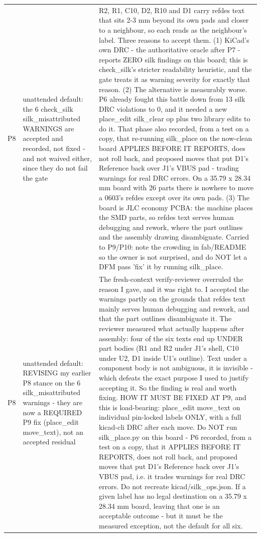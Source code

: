 \documentclass[11pt,a4paper]{article}
\begin{document}
{\begin{longtable}{lp{5.2cm}p{7.2cm}}
P8 & unattended default: the 6 check\_silk silk\_misattributed WARNINGS are accepted and recorded, not fixed - and not waived either, since they do not fail the gate & R2, R1, C10, D2, R10 and D1 carry refdes text that sits 2-3 mm beyond its own pads and closer to a neighbour, so each reads as the neighbour's label. Three reasons to accept them. (1) KiCad's own DRC - the authoritative oracle after P7 - reports ZERO silk findings on this board; this is check\_silk's stricter readability heuristic, and the gate treats it as warning severity for exactly that reason. (2) The alternative is measurably worse. P6 already fought this battle down from 13 silk DRC violations to 0, and it needed a new place\_edit silk\_clear op plus two library edits to do it. That phase also recorded, from a test on a copy, that re-running silk\_place on the now-clean board APPLIES BEFORE IT REPORTS, does not roll back, and proposed moves that put D1's Reference back over J1's VBUS pad - trading warnings for real DRC errors. On a 35.79 x 28.34 mm board with 26 parts there is nowhere to move a 0603's refdes except over its own pads. (3) The board is JLC economy PCBA: the machine places the SMD parts, so refdes text serves human debugging and rework, where the part outlines and the assembly drawing disambiguate. Carried to P9/P10: note the crowding in fab/README so the owner is not surprised, and do NOT let a DFM pass 'fix' it by running silk\_place. \\
P8 & unattended default: REVISING my earlier P8 stance on the 6 silk\_misattributed warnings - they are now a REQUIRED P9 fix (place\_edit move\_text), not an accepted residual & The fresh-context verify-reviewer overruled the reason I gave, and it was right to. I accepted the warnings partly on the grounds that refdes text mainly serves human debugging and rework, and that the part outlines disambiguate it. The reviewer measured what actually happens after assembly: four of the six texts end up UNDER part bodies (R1 and R2 under J1's shell, C10 under U2, D1 inside U1's outline). Text under a component body is not ambiguous, it is invisible - which defeats the exact purpose I used to justify accepting it. So the finding is real and worth fixing. HOW IT MUST BE FIXED AT P9, and this is load-bearing: place\_edit move\_text on individual pin-locked labels ONLY, with a full kicad-cli DRC after each move. Do NOT run silk\_place.py on this board - P6 recorded, from a test on a copy, that it APPLIES BEFORE IT REPORTS, does not roll back, and proposed moves that put D1's Reference back over J1's VBUS pad, i.e. it trades warnings for real DRC errors. Do not recreate kicad/silk\_ops.json. If a given label has no legal destination on a 35.79 x 28.34 mm board, leaving that one is an acceptable outcome - but it must be the measured exception, not the default for all six. \\

\end{longtable}}
\end{document}
